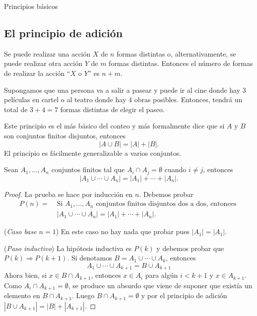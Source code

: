 \begin{section}{Principios básicos}


\subsection*{El principio de adición}

Se puede realizar una acción $X$ de $n$ formas distintas o, alternativamente, se puede realizar otra acción $Y$ de $m$ formas distintas. Entonces el número de formas de realizar la acción ``$X$ o $Y$'' es $n + m$.

\begin{ejemplo}\label{cine} Supongamos que una persona va a salir a pasear  y puede ir al cine donde hay $3$ películas en cartel o al teatro donde hay $4$ obras posibles. Entonces, tendrá un total de $3+4=7$ formas distintas de elegir el paseo. 
\end{ejemplo}


Este principio es el más básico del conteo y más formalmente dice que si $A$ y $B$ son conjuntos finitos disjuntos, entonces 
\begin{equation*}
|A \cup B| =|A|+|B|.
\end{equation*}
El principio es fácilmente generalizable a varios conjuntos.

\begin{proposicion}\label{principiodeadicion}
Sean $A_1,\ldots,A_n$ conjuntos finitos tal que $A_i \cap A_j = \emptyset$ cuando $i\not=j$, entonces 
\begin{equation*}
|A_1 \cup \cdots \cup A_n| =|A_1|+\cdots+|A_n|.
\end{equation*}
\end{proposicion}



\begin{proof} 
La  prueba se hace por inducción en $n$. Debemos probar 
\begin{align*}
P(n) =\; &\text{Si $A_1,\ldots,A_n$ conjuntos finitos disjuntos dos a dos, entonces }\\  &|A_1 \cup \cdots \cup A_n| =|A_1|+\cdots+|A_n|.
\end{align*}

\noindent({\em Caso base $n=1$}) En este caso no hay nada que probar pues  $|A_1|=|A_1|$.

\noindent({\em Paso inductivo}) La hipótesis inductiva es $P(k)$ y debemos probar que $P(k) \Rightarrow P(k+1)$. Si denotamos $B = A_1 \cup \cdots \cup A_k$, entonces 
$$
A_1 \cup \cdots \cup A_{k+1} = B \cup A_{k+1}
$$
Ahora bien, si $x \in B \cap A_{k+1}$, entonces $x \in A_i$ para algún $i < k+1$ y $x \in A_{k+1}$. Como $A_{i} \cap A_{k+1} = \emptyset$, se produce un absurdo  que viene de suponer que existía un elemento en $B \cap A_{k+1}$. Luego   $B \cap A_{k+1}= \emptyset$ y por el principio de adición  $|B \cup A_{k+1}| = |B|+|A_{k+1}|$. 


\end{proof}
\end{section}
